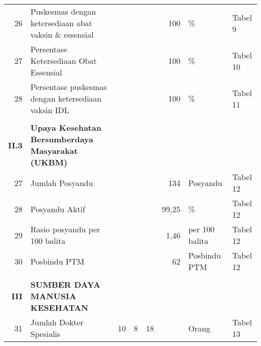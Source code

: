 \begin{small}
\begin{longtable}{rY{12em}rrrrY{5em}Y{5em}}
	 26 & Puskesmas dengan ketersediaan obat vaksin \& essensial                      &        &        &                    &      100 & \%                             & Tabel 9  \\
	 27 & Persentase Ketersediaan Obat Essensial                                      &        &        &                    &      100 & \%                             & Tabel 10 \\
	 28 & Persentase puskesmas dengan ketersediaan vaksin IDL                         &        &        &                    &      100 & \%                             & Tabel 11 \\
	 &                                                                                &        &        &                    &          &                                &          \\
	\textbf{II.3} & \textbf{Upaya Kesehatan Bersumberdaya Masyarakat (UKBM)}          &        &        &                    &          &                                &          \\
	 27 & Jumlah Posyandu                                                             &        &        &                    &      134 & Posyandu                       & Tabel 12 \\
	 28 & Posyandu Aktif                                                              &        &        &                    &    99,25 & \%                             & Tabel 12 \\
	 29 & Rasio posyandu per 100 balita                                               &        &        &                    &     1,46 & per 100 balita                 & Tabel 12 \\
	 30 & Posbindu PTM                                                                &        &        &                    &       62 & Posbindu PTM                   & Tabel 12 \\
	 &                                                                                &        &        &                    &          &                                &          \\
	\textbf{III} & \textbf{SUMBER DAYA MANUSIA KESEHATAN}                             &        &        &                    &          &                                &          \\
	 31 & Jumlah Dokter Spesialis                                                     &     10 &      8 &                 18 &          & Orang                          & Tabel 13 \\

\end{longtable}
\end{small}
